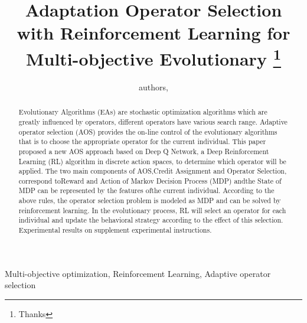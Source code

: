 \documentclass[journal]{IEEEtran}
\newcommand{\TODO}[1]{\textcolor[rgb]{1.00,0.40,0.22}{#1}}
\begin{document}
\title{{Adaptation Operator Selection with Reinforcement Learning for Multi-objective Evolutionary}
  \thanks{Thanks}}
\author{
  authors,
}%



\maketitle

\begin{abstract}
  Evolutionary Algorithms (EAs) are stochastic optimization algorithms which are greatly influenced by operators, different operators have various search range.
  Adaptive operator selection (AOS) provides the on-line control of the evolutionary algorithms that is to choose the appropriate operator for the current individual.
  This paper proposed a new AOS approach based on Deep Q Network, a Deep Reinforcement Learning (RL) algorithm in discrete action spaces, to determine which operator will be applied.
  The two main components of AOS,Credit Assignment and Operator Selection, correspond toReward and Action of Markov Decision Process (MDP) andthe State of MDP can be represented by the features ofthe current individual.
  According to the above rules, the operator selection problem is modeled as MDP and can be solved by reinforcement learning.
  In the evolutionary process, RL will select an operator for each individual and update the behavioral strategy according to the effect of this selection.
  Experimental results on \TODO{supplement experimental instructions}.
\end{abstract}

\begin{IEEEkeywords}
  Multi-objective optimization, Reinforcement Learning, Adaptive operator selection
\end{IEEEkeywords}
\end{document}
